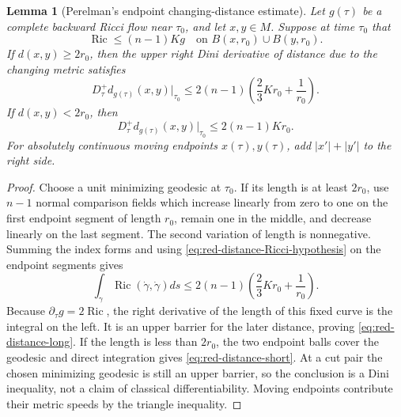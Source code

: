 \documentclass[10pt]{coll-l}
\newtheorem{lemma}[theorem]{Lemma}
\theoremstyle{definition}
\theoremstyle{remark}
\numberwithin{section}{chapter}
\numberwithin{equation}{chapter}
\newcommand{\Ric}{\operatorname{Ric}}
\begin{document}
\begin{lemma}[Perelman's endpoint changing-distance estimate]
\label{lem:red-changing-distance}
Let $g(\tau)$ be a complete backward Ricci flow near $\tau_0$, and let
$x,y\in M$.  Suppose at time $\tau_0$ that
\begin{equation}
 \Ric\leq(n-1)K g
 \quad\text{on }B(x,r_0)\cup B(y,r_0).                  \label{eq:red-distance-Ricci-hypothesis}
\end{equation}
If $d(x,y)\geq2r_0$, then the upper right Dini derivative of distance due to
the changing metric satisfies
\begin{equation}
 D^+_\tau d_{g(\tau)}(x,y)\big|_{\tau_0}
 \leq2(n-1)\left(\frac23Kr_0+\frac1{r_0}\right).        \label{eq:red-distance-long}
\end{equation}
If $d(x,y)<2r_0$, then
\begin{equation}
 D^+_\tau d_{g(\tau)}(x,y)\big|_{\tau_0}
                         \leq2(n-1)Kr_0.                 \label{eq:red-distance-short}
\end{equation}
For absolutely continuous moving endpoints $x(\tau),y(\tau)$, add
$|x'|+|y'|$ to the right side.
\end{lemma}

\begin{proof}
Choose a unit minimizing geodesic at $\tau_0$.  If its length is at least
$2r_0$, use $n-1$ normal comparison fields which increase linearly from zero
to one on the first endpoint segment of length $r_0$, remain one in the
middle, and decrease linearly on the last segment.  The second variation of
length is nonnegative.  Summing the index forms and using
\eqref{eq:red-distance-Ricci-hypothesis} on the endpoint segments gives
\begin{equation}
 \int_\gamma\Ric(\dot\gamma,\dot\gamma)ds
 \leq2(n-1)\left(\frac23Kr_0+\frac1{r_0}\right).        \label{eq:red-distance-index-bound}
\end{equation}
Because $\partial_\tau g=2\Ric$, the right derivative of the length of this
fixed curve is the integral on the left.  It is an upper barrier for the
later distance, proving \eqref{eq:red-distance-long}.  If the length is less
than $2r_0$, the two endpoint balls cover the geodesic and direct integration
gives \eqref{eq:red-distance-short}.  At a cut pair the chosen minimizing
geodesic is still an upper barrier, so the conclusion is a Dini inequality,
not a claim of classical differentiability.  Moving endpoints contribute
their metric speeds by the triangle inequality.
\end{proof}
\end{document}
